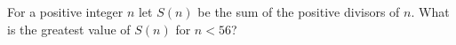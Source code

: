 For a positive integer $n$ let $S(n)$ be the sum of the positive divisors of $n$. What is the greatest value of $S(n)$ for $n<56$?

